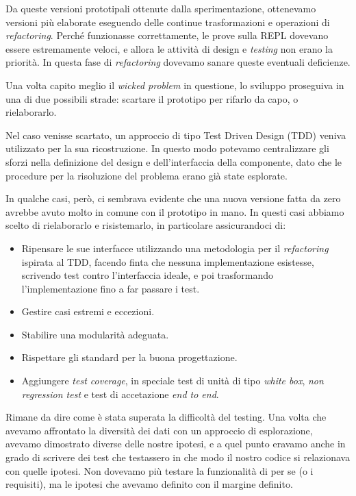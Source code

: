 \documentclass[12pt]{report}
\begin{document}
Da queste versioni prototipali ottenute dalla sperimentazione, ottenevamo versioni più elaborate eseguendo delle continue trasformazioni e operazioni di \textit{refactoring}. Perché funzionasse correttamente, le prove sulla REPL dovevano essere estremamente veloci, e allora le attività di design e \textit{testing} non erano la priorità. In questa fase di \textit{refactoring} dovevamo sanare queste eventuali deficienze.

Una volta capito meglio il \textit{wicked problem} in questione, lo sviluppo proseguiva in una di due possibili strade: scartare il prototipo per rifarlo da capo, o rielaborarlo.

Nel caso venisse scartato, un approccio di tipo Test Driven Design (TDD) veniva utilizzato per la sua ricostruzione. In questo modo potevamo centralizzare gli sforzi nella definizione del design e dell'interfaccia della componente, dato che le procedure per la risoluzione del problema erano già state esplorate.

In qualche casi, però, ci sembrava evidente che una nuova versione fatta da zero avrebbe avuto molto in comune con il prototipo in mano. In questi casi abbiamo scelto di rielaborarlo e risistemarlo, in particolare assicurandoci di:

\begin{itemize}
	\item Ripensare le sue interfacce utilizzando una metodologia per il \textit{refactoring} ispirata al TDD, facendo finta che nessuna implementazione esistesse, scrivendo test contro l'interfaccia ideale, e poi trasformando l'implementazione fino a far passare i test.
	\item Gestire casi estremi e eccezioni.
	\item Stabilire una modularità adeguata.
	\item Rispettare gli standard per la buona progettazione.
	\item Aggiungere \textit{test coverage}, in speciale test di unità di tipo \textit{white box}, \textit{non regression test} e test di accetazione \textit{end to end}.
\end{itemize}

Rimane da dire come è stata superata la difficoltà del testing. Una volta che avevamo affrontato la diversità dei dati con un approccio di esplorazione, avevamo dimostrato diverse delle nostre ipotesi, e a quel punto eravamo anche in grado di scrivere dei test che testassero in che modo il nostro codice si relazionava con quelle ipotesi. Non dovevamo più testare la funzionalità di per se (o i requisiti), ma le ipotesi che avevamo definito con il margine definito.
\end{document}
